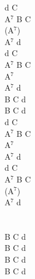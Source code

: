 \documentclass[a5paper, 10pt]{book}
\begin{document}
\begin{minipage}[t]{0.2\textwidth}
d C\\
A$^7$ B C\\
(A$^7$)\\
A$^7$ d\\

d C\\
A$^7$ B C\\
A$^7$\\
A$^7$ d\\

B C d\\
B C d\\

d C\\
A$^7$ B C\\
A$^7$\\
A$^7$ d\\

d C\\
A$^7$ B C\\
(A$^7$)\\
A$^7$ d\\

~\\~\\
B C d\\
B C d\\
B C d\\
B C d\\
\end{minipage}

\newpage
\end{document}
